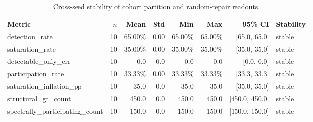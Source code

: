 \begin{table}[t]
\centering
\small
\caption{Cross-seed stability of cohort partition and random-repair readouts.}
\label{tab:multiseed-stability}
\begin{tabular}{@{}lrrrrrrl@{}}
\toprule
Metric & $n$ & Mean & Std & Min & Max & 95\% CI & Stability \\
\midrule
detection\_rate & 10 & 65.00\% & 0.00 & 65.00\% & 65.00\% & [65.0, 65.0] & stable \\
saturation\_rate & 10 & 35.00\% & 0.00 & 35.00\% & 35.00\% & [35.0, 35.0] & stable \\
detectable\_only\_crr & 10 & 0.0 & 0.0 & 0.0 & 0.0 & [0.0, 0.0] & stable \\
participation\_rate & 10 & 33.33\% & 0.00 & 33.33\% & 33.33\% & [33.3, 33.3] & stable \\
saturation\_inflation\_pp & 10 & 35.0 & 0.0 & 35.0 & 35.0 & [35.0, 35.0] & stable \\
structural\_gt\_count & 10 & 450.0 & 0.0 & 450.0 & 450.0 & [450.0, 450.0] & stable \\
spectrally\_participating\_count & 10 & 150.0 & 0.0 & 150.0 & 150.0 & [150.0, 150.0] & stable \\
\bottomrule
\end{tabular}
\end{table}


